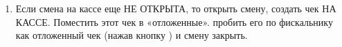 \begin{itemize}
\begin{enumerate}[label={\Alph*)},font={\color{blue!50!black}\bfseries}]
		\item Если смена на кассе еще НЕ ОТКРЫТА, то открыть смену, создать чек НА КАССЕ. Поместить этот чек в «отложенные». пробить его по фискальнику как отложенный чек (нажав кнопку ) и  смену закрыть.
	\end{enumerate}



	
	
\end{itemize}
